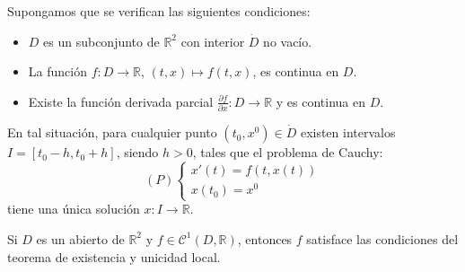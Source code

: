 \begin{corollary}
    Supongamos que se verifican las siguientes condiciones:
    \begin{itemize}
        \item $D$ es un subconjunto de $\mathbb{R}^2$ con interior $\dot{D}$ no vacío.
        \item La función $f: D \to \mathbb{R}$, $(t, x) \mapsto f(t, x)$, es continua en $D$.
        \item Existe la función derivada parcial $\frac{\partial f}{\partial x}: D \to \mathbb{R}$ y es continua en $D$.
    \end{itemize}
    En tal situación, para cualquier punto $(t_0, x^0) \in \dot{D}$ existen intervalos $I = [t_0 - h, t_0 + h]$, siendo $h > 0$, tales que el problema de Cauchy:
    $$(P) \begin{cases}
            x'(t) = f(t, x(t)) \\
            x(t_0) = x^0
        \end{cases}$$
    tiene una única solución $x: I \to \mathbb{R}$.
\end{corollary}

\begin{remark}
    Si $D$ es un abierto de $\mathbb{R}^2$ y $f \in \mathcal{C}^1(D, \mathbb{R})$, entonces $f$ satisface las condiciones del teorema de existencia y unicidad local.
\end{remark}